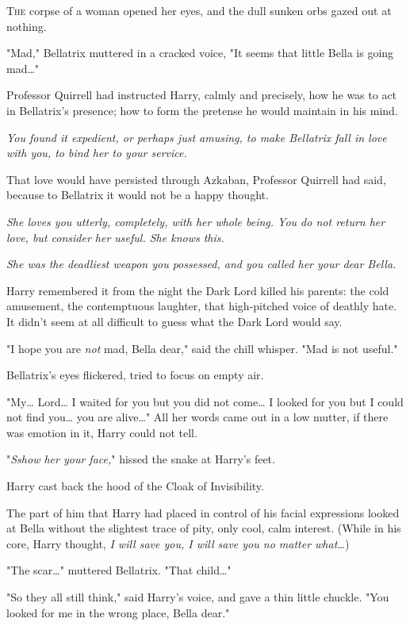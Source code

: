 
\lettrine{T}{he} corpse of a 
woman opened her eyes, and the dull sunken orbs gazed out at nothing.

"Mad," Bellatrix muttered in a cracked voice, "It seems that little Bella is 
going mad{\ldots}"

Professor Quirrell had instructed Harry, calmly and precisely, how he was to 
act in Bellatrix's presence; how to form the pretense he would maintain in his 
mind.

\emph{You found it expedient, or perhaps just amusing, to make Bellatrix fall 
in love with you, to bind her to your service.}

That love would have persisted through Azkaban, Professor Quirrell had said, 
because to Bellatrix it would not be a happy thought.

\emph{She loves you utterly, completely, with her whole being. You do not 
return her love, but consider her useful. She knows this.}

\emph{She was the deadliest weapon you possessed, and you called her your dear 
Bella.}

Harry remembered it from the night the Dark Lord killed his parents: the cold 
amusement, the contemptuous laughter, that high-pitched voice of deathly hate. 
It didn't seem at all difficult to guess what the Dark Lord would say.

"I hope you are \emph{not} mad, Bella dear," said the chill whisper. "Mad is 
not useful."

Bellatrix's eyes flickered, tried to focus on empty air.

"My{\ldots} Lord{\ldots} I waited for you but you did not come{\ldots} I looked 
for you but I could not find you{\ldots} you are alive{\ldots}" All her words 
came out in a low mutter, if there was emotion in it, Harry could not tell.

"\emph{Sshow her your face,}" hissed the snake at Harry's feet.

Harry cast back the hood of the Cloak of Invisibility.

The part of him that Harry had placed in control of his facial expressions 
looked at Bella without the slightest trace of pity, only cool, calm interest. 
(While in his core, Harry thought, \emph{I will save you, I will save you no 
matter what{\ldots}})

"The scar{\ldots}" muttered Bellatrix. "That child{\ldots}"

"So they all still think," said Harry's voice, and gave a thin little chuckle. 
"You looked for me in the wrong place, Bella dear."

